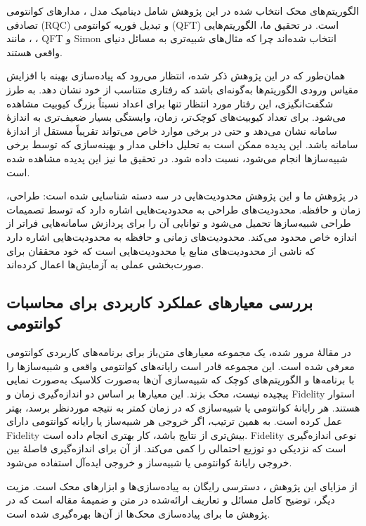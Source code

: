 الگوریتم‌های محک انتخاب شده در این پژوهش
\cite{jamadagni_benchmarking_2024}
شامل دینامیک مدل ، مدارهای کوانتومی تصادفی (RQC) و تبدیل فوریه کوانتومی (QFT) است. در تحقیق ما، الگوریتم‌هایی مانند ، ، QFT و Simon انتخاب شده‌اند چرا که مثال‌های شبیه‌تری به مسائل دنیای واقعی هستند.

همان‌طور که در این پژوهش
\cite{jamadagni_benchmarking_2024}
ذکر شده، انتظار می‌رود که پیاده‌سازی بهینه با افزایش مقیاس ورودی الگوریتم‌ها به‌گونه‌ای باشد که رفتاری متناسب از خود نشان دهد. به طرز شگفت‌انگیزی، این رفتار مورد انتظار تنها برای اعداد نسبتاً بزرگ کیوبیت مشاهده می‌شود. برای تعداد کیوبیت‌های کوچک‌تر، زمان، وابستگی بسیار ضعیف‌تری به اندازهٔ سامانه نشان می‌دهد و حتی در برخی موارد خاص می‌تواند تقریباً مستقل از اندازهٔ سامانه باشد. این پدیده ممکن است به تحلیل داخلی مدار و بهینه‌سازی که توسط برخی شبیه‌سازها انجام می‌شود، نسبت داده شود. در تحقیق ما نیز این پدیده مشاهده شده است.

در پژوهش ما و این پژوهش
\cite{jamadagni_benchmarking_2024}
محدودیت‌هایی در سه دسته شناسایی شده است: طراحی، زمان و حافظه. محدودیت‌های طراحی به محدودیت‌هایی اشاره دارد که توسط تصمیمات طراحی شبیه‌سازها تحمیل می‌شود و توانایی آن را برای پردازش سامانه‌هایی فراتر از اندازه خاص محدود می‌کند. محدودیت‌های زمانی و حافظه به محدودیت‌هایی اشاره دارد که ناشی از محدودیت‌های منابع یا محدودیت‌هایی است که خود محققان برای صورت‌بخشی عملی به آزمایش‌ها اعمال کرده‌اند.

\subsection{بررسی معیارهای عملکرد کاربردی برای محاسبات کوانتومی\cite{lubinski_application-oriented_2023}}
در مقالهٔ مرور شده، یک مجموعه معیارهای متن‌باز برای برنامه‌های کاربردی کوانتومی معرفی شده است. این مجموعه قادر است رایانه‌های کوانتومی واقعی و شبیه‌سازها را با برنامه‌ها و الگوریتم‌های کوچک که شبیه‌سازی آن‌ها به‌صورت کلاسیک به‌صورت نمایی پیچیده نیست، محک بزند. این معیارها بر اساس دو اندازه‌گیری زمان و Fidelity استوار هستند. هر رایانهٔ کوانتومی یا شبیه‌سازی که در زمان کمتر به نتیجه موردنظر برسد، بهتر عمل کرده است. به همین ترتیب، اگر خروجی هر شبیه‌ساز یا رایانه کوانتومی دارای Fidelity بیش‌تری از نتایج باشد، کار بهتری انجام داده است. Fidelity نوعی اندازه‌گیری است که نزدیکی دو توزیع احتمالی را کمی می‌کند. از آن برای اندازه‌گیری فاصلهٔ بین خروجی رایانهٔ کوانتومی یا شبیه‌ساز و خروجی ایده‌آل استفاده می‌شود.

از مزایای این پژوهش
\cite{lubinski_application-oriented_2023}،
دسترسی رایگان به پیاده‌سازی‌ها و ابزارهای محک است. مزیت دیگر، توضیح کامل مسائل و تعاریف ارائه‌شده در متن و ضمیمهٔ مقاله است که در پژوهش ما برای پیاده‌سازی محک‌ها از آن‌ها بهره‌گیری شده است.

